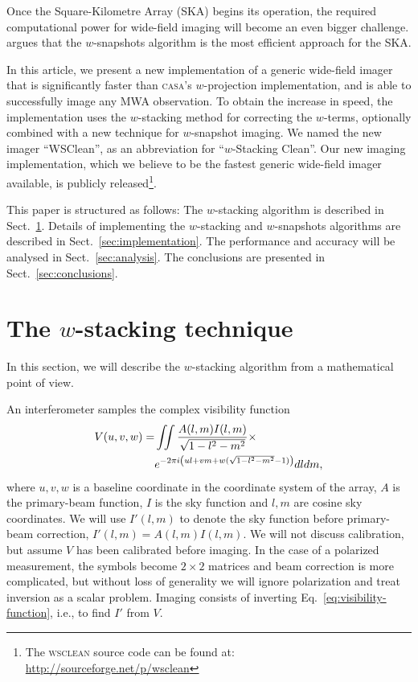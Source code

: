 \documentclass[useAMS,usenatbib]{mn2e}
\begin{document}
Once the Square-Kilometre Array (SKA) begins its operation, the required computational power for wide-field imaging will become an even bigger challenge. \citet{widefield-imaging-ska-cornwell} argues that the $w$-snapshots algorithm is the most efficient approach for the SKA.

In this article, we present a new implementation of a generic wide-field imager that is significantly faster than \textsc{casa}'s $w$-projection implementation, and is able to successfully image any MWA observation. To obtain the increase in speed, the implementation uses the $w$-stacking method for correcting the $w$-terms, optionally combined with a new technique for $w$-snapshot imaging. We named the new imager ``WSClean'', as an abbreviation for ``$w$-Stacking Clean''. Our new imaging implementation, which we believe to be the fastest generic wide-field imager available, is publicly released\footnote{The \textsc{wsclean} source code can be found at:\\\href{http://sourceforge.net/p/wsclean}{http://sourceforge.net/p/wsclean}}.

This paper is structured as follows: The $w$-stacking algorithm is described in Sect.~\ref{sec:wstacking}. Details of implementing the $w$-stacking and $w$-snapshots algorithms are described in Sect.~\ref{sec:implementation}. The performance and accuracy will be analysed in Sect.~\ref{sec:analysis}. The conclusions are presented in Sect.~\ref{sec:conclusions}.

\section{The $w$-stacking technique} \label{sec:wstacking}
In this section, we will describe the $w$-stacking algorithm from a mathematical point of view.

An interferometer samples the complex visibility function
\begin{align}\notag
V(u,v,w) = & \iint \frac{A(l,m) I(l,m)}{\sqrt{1-l^2-m^2}} \times \\ \label{eq:visibility-function}
& e^{-2\pi i \left(ul + vm + w(\sqrt{1-l^2-m^2}-1)\right)} dl dm,
\end{align}
where $u,v,w$ is a baseline coordinate in the coordinate system of the array, $A$ is the primary-beam function, $I$ is the sky function and $l,m$ are cosine sky coordinates. We will use $I'(l,m)$ to denote the sky function before primary-beam correction, $I'(l,m)=A(l,m)I(l,m)$. We will not discuss calibration, but assume $V$ has been calibrated before imaging. In the case of a polarized measurement, the symbols become $2\times 2$ matrices and beam correction is more complicated, but without loss of generality we will ignore polarization and treat inversion as a scalar problem. Imaging consists of inverting Eq.~\eqref{eq:visibility-function}, i.e., to find $I'$ from $V$.
\end{document}
